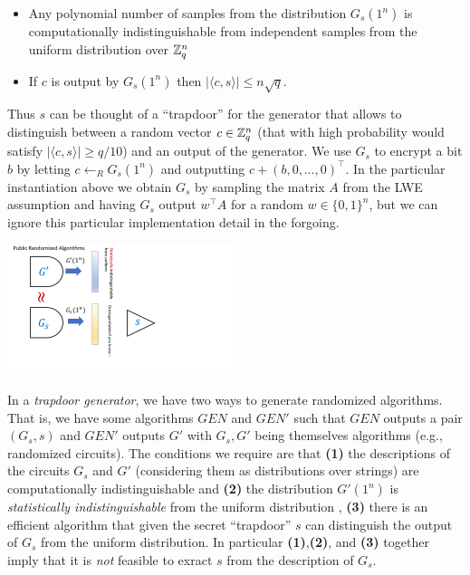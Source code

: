 \begin{itemize}
\item
  Any polynomial number of samples from the distribution \(G_s(1^n)\) is
  computationally indistinguishable from independent samples from the
  uniform distribution over \({\mathbb{Z}}_q^n\)
\item
  If \(c\) is output by \(G_s(1^n)\) then
  \(|\langle c,s \rangle| \leq n\sqrt{q}\).
\end{itemize}

Thus \(s\) can be thought of a ``trapdoor'' for the generator that
allows to distinguish between a random vector \(c\in {\mathbb{Z}}_q^n\) (that with
high probability would satisfy \(|\langle c,s \rangle|\geq q/10\)) and
an output of the generator. We use \(G_s\) to encrypt a bit \(b\) by
letting \(c \leftarrow_R G_s(1^n)\) and outputting
\(c + (b,0,\ldots,0)^\top\). In the particular instantiation above we
obtain \(G_s\) by sampling the matrix \(A\) from the LWE assumption and
having \(G_s\) output \(w^\top A\) for a random \(w\in\{0,1\}^n\), but
we can ignore this particular implementation detail in the forgoing.


\begin{marginfigure}
\centering
\includegraphics[width=\linewidth, height=1.5in, keepaspectratio]{../figure/trapdoorprg.png}
\caption{In a \emph{trapdoor generator}, we have two ways to generate
randomized algorithms. That is, we have some algorithms
\(\ensuremath{\mathit{GEN}}\) and \(\ensuremath{\mathit{GEN}}'\) such
that \(\ensuremath{\mathit{GEN}}\) outputs a pair \((G_s,s)\) and
\(\ensuremath{\mathit{GEN}}'\) outputs \(G'\) with \(G_s,G'\) being
themselves algorithms (e.g., randomized circuits). The conditions we
require are that \textbf{(1)} the descriptions of the circuits \(G_s\)
and \(G'\) (considering them as distributions over strings) are
computationally indistinguishable and \textbf{(2)} the distribution
\(G'(1^n)\) is \emph{statistically indistinguishable} from the uniform
distribution , \textbf{(3)} there is an efficient algorithm that given
the secret ``trapdoor'' \(s\) can distinguish the output of \(G_s\) from
the uniform distribution. In particular \textbf{(1)},\textbf{(2)}, and
\textbf{(3)} together imply that it is \emph{not} feasible to exract
\(s\) from the description of \(G_s\).}
\label{TDPgenfig}
\end{marginfigure}

